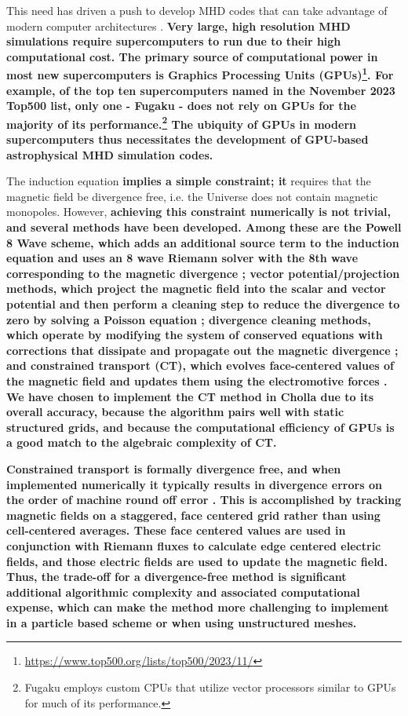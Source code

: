 \documentclass[modern, linenumbers]{aastex631}
\begin{document}
This need has driven a push to develop MHD codes that can take advantage of modern computer architectures \citep[e.g.][]{schive_gamer-2_2018, almgren_castro_2020, zingale_castro_2020, shankar_gram-x_2022, liska_h-amr_2022, begue_cuharm_2023, holmen_early_2023, parthenon_2023}. \textbf{Very large, high resolution MHD simulations require supercomputers to run due to their high computational cost. The primary source of computational power in most new supercomputers is Graphics Processing Units (GPUs)\footnote{\url{https://www.top500.org/lists/top500/2023/11/}}. For example, of the top ten supercomputers named in the November 2023 Top500 list, only one - Fugaku - does not rely on GPUs for the majority of its performance.\footnote{Fugaku employs custom CPUs that utilize vector processors similar to GPUs for much of its performance.} The ubiquity of GPUs in modern supercomputers thus necessitates the development of GPU-based astrophysical MHD simulation codes.}

The induction equation \textbf{implies a simple constraint; it} requires that the magnetic field be divergence free, i.e. the Universe does not contain magnetic monopoles. However, \textbf{achieving this constraint numerically is not trivial, and several methods have been developed. Among these are the Powell 8 Wave scheme, which adds an additional source term to the induction equation and uses an 8 wave Riemann solver with the 8th wave corresponding to the magnetic divergence \citep{Powell1997}; 
vector potential/projection methods, which project the magnetic field into the scalar and vector potential and then perform a cleaning step to reduce the divergence to zero by solving a Poisson equation \citep{brackbill_1980,ryu_1995,Crockett_2005,torrilhon2005locally}; 
divergence cleaning methods, which operate by modifying the system of conserved equations with corrections that dissipate and propagate out the magnetic divergence \citep{dedner_hyperbolic_2002,mignone_2010}; and constrained transport (CT), which evolves face-centered values of the magnetic field and updates them using the electromotive forces \citep{evans_1988}.
We have chosen to implement the CT method in Cholla due to its overall accuracy, because the algorithm pairs well with static structured grids, and because the computational efficiency of GPUs is a good match to the algebraic complexity of CT.}

\textbf{Constrained transport is formally divergence free, and when implemented numerically it typically results in divergence errors on the order of machine round off error \citep{evans_1988, gardiner_2005, stone_athena_2008, stone_2009, zingale_castro_2020, almgren_castro_2020}. This is accomplished by tracking magnetic fields on a staggered, face centered grid rather than using cell-centered averages. These face centered values are used in conjunction with Riemann fluxes to calculate edge centered electric fields, and those electric fields are used to update the magnetic field. Thus, the trade-off for a divergence-free method is significant additional algorithmic complexity and associated computational expense, which can make the method more challenging to implement in a particle based scheme or when using unstructured meshes.}
\end{document}
